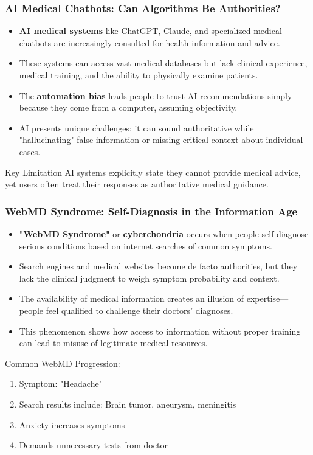 \documentclass{beamer}
\begin{document}
	\begin{frame}
		\frametitle{AI Medical Chatbots: Can Algorithms Be Authorities?}
		\begin{itemize}
			\item \textbf{AI medical systems} like ChatGPT, Claude, and specialized medical chatbots are increasingly consulted for health information and advice.
			\item These systems can access vast medical databases but lack clinical experience, medical training, and the ability to physically examine patients.
			\item The \textbf{automation bias} leads people to trust AI recommendations simply because they come from a computer, assuming objectivity.
			\item AI presents unique challenges: it can sound authoritative while "hallucinating" false information or missing critical context about individual cases.
		\end{itemize}
		
		\begin{alertblock}{Key Limitation}
			AI systems explicitly state they cannot provide medical advice, yet users often treat their responses as authoritative medical guidance.
		\end{alertblock}
	\end{frame}
	
	\begin{frame}
		\frametitle{WebMD Syndrome: Self-Diagnosis in the Information Age}
		\begin{itemize}
			\item \textbf{"WebMD Syndrome"} or \textbf{cyberchondria} occurs when people self-diagnose serious conditions based on internet searches of common symptoms.
			\item Search engines and medical websites become de facto authorities, but they lack the clinical judgment to weigh symptom probability and context.
			\item The availability of medical information creates an illusion of expertise—people feel qualified to challenge their doctors' diagnoses.
			\item This phenomenon shows how access to information without proper training can lead to misuse of legitimate medical resources.
		\end{itemize}
		
		\begin{example}
			\scriptsize
			Common WebMD Progression:
			\begin{enumerate}
				\item Symptom: "Headache"
				\item Search results include: Brain tumor, aneurysm, meningitis
				\item Anxiety increases symptoms
				\item Demands unnecessary tests from doctor
			\end{enumerate}
		\end{example}
	\end{frame}
	
\end{document}
